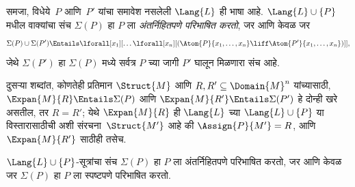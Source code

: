 \begin{defn}
समजा, विधेये~$P$ आणि~$P'$ यांचा समावेश नसलेली
$\Lang{L}$ ही भाषा आहे. $\Lang{L} \cup \{P\}$ मधील
वाक्यांचा संच $\Sigma(P)$ हा $P$ ला \emph{अंतर्निहितपणे परिभाषित
करतो}, जर आणि केवळ जर
\[\Sigma(P) \cup \Sigma(P') \Entails \lforall[x_1][\dots
  \lforall[x_n][(\Atom{P}{x_1,\dots, x_n} \liff \Atom{P'}{x_1,\dots,
      x_n})]],
\]
जेथे $\Sigma(P')$ हा $\Sigma(P)$ मध्ये सर्वत्र $P$ च्या जागी $P'$ घालून
मिळणारा संच आहे.
\end{defn}

दुसऱ्या शब्दांत, कोणतेही प्रतिमान $\Struct{M}$ आणि $R, R' \subseteq
\Domain{M}^n$ यांच्यासाठी, $\Expan{M}{R} \Entails \Sigma(P)$ आणि
$\Expan{M}{R'} \Entails \Sigma(P')$ हे दोन्ही खरे असतील, तर $R=R'$;
येथे $\Expan{M}{R}$ ही $\Lang{L}$ च्या $\Lang{L} \cup \{P\}$ या
विस्तारासाठीची अशी संरचना~$\Struct{M'}$ आहे की
$\Assign{P}{M'} = R$, आणि $\Expan{M}{R'}$ साठीही तसेच.

\begin{thm}[बेथचे परिभाष्यता प्रमेय] $\Lang{L}
  \cup\{P\}$-सूत्रांचा संच $\Sigma(P)$ हा $P$ ला अंतर्निहितपणे
  परिभाषित करतो, जर आणि केवळ जर $\Sigma(P)$ हा $P$ ला स्पष्टपणे परिभाषित करतो.

\end{thm}

